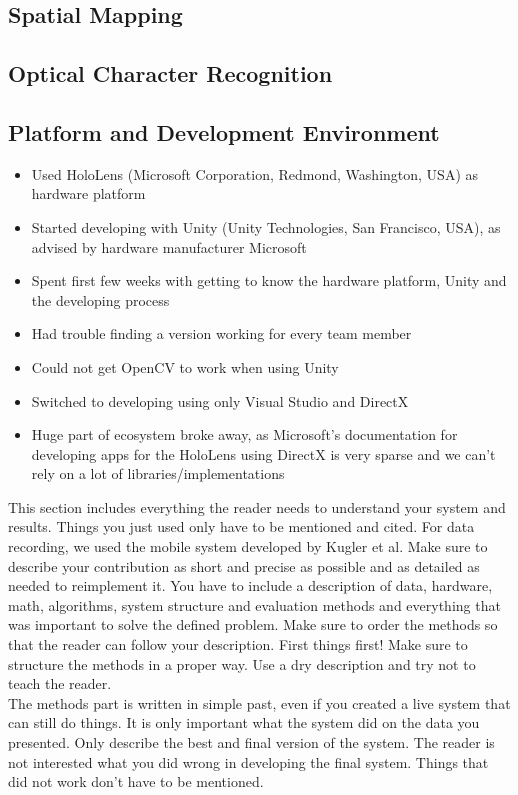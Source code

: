 \subsection{Spatial Mapping}
\subsection{Optical Character Recognition}

\subsection{Platform and Development Environment}
\begin{itemize}
	\item
		Used HoloLens (Microsoft Corporation, Redmond, Washington, USA) as hardware platform
	\item
		Started developing with Unity (Unity Technologies, San Francisco, USA), as advised by hardware manufacturer Microsoft
	\item
		Spent first few weeks with getting to know the hardware platform, Unity and the developing process
	\item
		Had trouble finding a version working for every team member
	\item
		Could not get OpenCV to work when using Unity
	\item
		Switched to developing using only Visual Studio and DirectX
	\item
		Huge part of ecosystem broke away, as Microsoft's documentation for developing apps for the HoloLens using DirectX is very sparse and we can't rely on a lot of libraries/implementations
\end{itemize}

This section includes everything the reader needs to understand your system and results. Things you just used only have to be mentioned and cited. For data recording, we used the mobile system developed by Kugler et al.
Make sure to describe your contribution as short and precise as possible and as detailed as needed to reimplement it. You have to include a description of data, hardware, math, algorithms, system structure and evaluation methods and everything that was important to solve the defined problem. Make sure to order the methods so that the reader can follow your description. First things first! Make sure to structure the methods in a proper way. Use a dry description and try not to teach the reader. \\
The methods part is written in simple past, even if you created a live system that can still do things. It is only important what the system did on the data you presented. Only describe the best and final version of the system. The reader is not interested what you did wrong in developing the final system. Things that did not work don't have to be mentioned.


